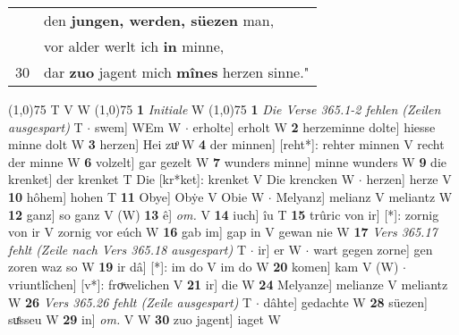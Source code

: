 \documentclass[8pt,a4paper,notitlepage]{article}
\begin{document}
\begin{table}[ht]
\begin{minipage}[t]{0.5\linewidth}
\begin{tabular}{rl}
 & den \textbf{jungen, werden, süezen} man,\\ 
 & vor alder werlt ich \textbf{in} minne,\\ 
30 & dar \textbf{zuo} jagent mich \textbf{mînes} herzen sinne."\\ 
\end{tabular}
\scriptsize
\line(1,0){75} \newline
T V W \newline
\line(1,0){75} \newline
\textbf{1} \textit{Initiale} W  \newline
\line(1,0){75} \newline
\textbf{1} \textit{Die Verse 365.1-2 fehlen (Zeilen ausgespart)} T   $\cdot$ swem] WEm W  $\cdot$ erholte] erholt W \textbf{2} herzeminne dolte] hiesse minne dolt W \textbf{3} herzen] Hei zuͦ W \textbf{4} der minnen] [reht*]: rehter minnen V recht der minne W \textbf{6} volzelt] gar gezelt W \textbf{7} wunders minne] minne wunders W \textbf{9} die krenket] der krenket T Die [kr*ket]: krenket V Die krencken W  $\cdot$ herzen] herze V \textbf{10} hôhem] hohen T \textbf{11} Obye] Obẏe V Obie W  $\cdot$ Melyanz] melianz V meliantz W \textbf{12} ganz] so ganz V (W) \textbf{13} ê] \textit{om.} V \textbf{14} iuch] îu T \textbf{15} trûric von ir] [*]: zornig von ir V zornig vor eúch W \textbf{16} gab im] gap in V gewan nie W \textbf{17} \textit{Vers 365.17 fehlt (Zeile nach Vers 365.18 ausgespart)} T   $\cdot$ ir] er W  $\cdot$ wart gegen zorne] gen zoren waz so W \textbf{19} ir dâ] [*]: im do V im do W \textbf{20} komen] kam V (W)  $\cdot$ vriuntlîchen] [v*]: froͮwelichen V \textbf{21} ir] die W \textbf{24} Melyanze] melianze V meliantz W \textbf{26} \textit{Vers 365.26 fehlt (Zeile ausgespart)} T   $\cdot$ dâhte] gedachte W \textbf{28} süezen] suͤsseu W \textbf{29} in] \textit{om.} V W \textbf{30} zuo jagent] iaget W \newline
\end{minipage}
\end{table}
\end{document}
